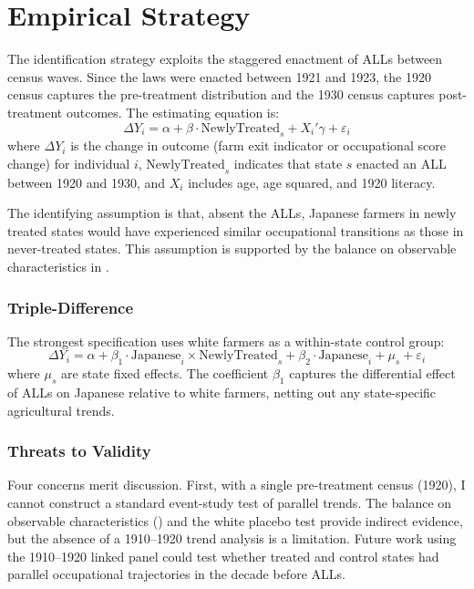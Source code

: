 \documentclass[12pt]{article}
\begin{document}
\section{Empirical Strategy}

The identification strategy exploits the staggered enactment of ALLs between census waves. Since the laws were enacted between 1921 and 1923, the 1920 census captures the pre-treatment distribution and the 1930 census captures post-treatment outcomes. The estimating equation is:
\begin{equation}
  \Delta Y_i = \alpha + \beta \cdot \text{NewlyTreated}_s + X_i'\gamma + \varepsilon_i
\end{equation}
where $\Delta Y_i$ is the change in outcome (farm exit indicator or occupational score change) for individual $i$, $\text{NewlyTreated}_s$ indicates that state $s$ enacted an ALL between 1920 and 1930, and $X_i$ includes age, age squared, and 1920 literacy.

The identifying assumption is that, absent the ALLs, Japanese farmers in newly treated states would have experienced similar occupational transitions as those in never-treated states. This assumption is supported by the balance on observable characteristics in .

\subsubsection*{Triple-Difference} The strongest specification uses white farmers as a within-state control group:
\begin{equation}
  \Delta Y_i = \alpha + \beta_1 \cdot \text{Japanese}_i \times \text{NewlyTreated}_s + \beta_2 \cdot \text{Japanese}_i + \mu_s + \varepsilon_i
\end{equation}
where $\mu_s$ are state fixed effects. The coefficient $\beta_1$ captures the differential effect of ALLs on Japanese relative to white farmers, netting out any state-specific agricultural trends.

\subsubsection*{Threats to Validity} Four concerns merit discussion. First, with a single pre-treatment census (1920), I cannot construct a standard event-study test of parallel trends. The balance on observable characteristics () and the white placebo test provide indirect evidence, but the absence of a 1910--1920 trend analysis is a limitation. Future work using the 1910--1920 linked panel could test whether treated and control states had parallel occupational trajectories in the decade before ALLs.
\end{document}

